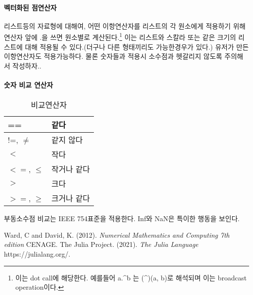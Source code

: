 \documentclass[a4paper, 11pt]{report}
\theoremstyle{definition}
\begin{document}
\paragraph{벡터화된 점연산자} 리스트등의 자료형에 대해여, 어떤 이항연산자를 리스트의 각 원소에게 적용하기 위해 연산자 앞에
.을 쓰면 원소별로 계산된다.\footnote{이는 dot call에 해당한다. 예를들어 a.\^{}b 는 (\^{})(a, b)로 해석되며 이는 broadcast operation이다. } 
이는 리스트와 스칼라 또는 같은 크기의 리스트에 대해 적용될 수 있다.(더구나 다른 형태끼리도 가능한경우가 있다.) 유저가 만든 이항연산자도 적용가능하다.
물론 숫자들과 적용시 소수점과 헷갈리지 않도록 주의해서 작성하자..
\paragraph{숫자 비교 연산자}
\begin{table}[h]
    \begin{tabular}{|l|l|}\hline
        == & 같다 \\ \hline
        !=, $\neq$ & 같지 않다 \\ \hline
        $<$ & 작다 \\ \hline
        $<=$, $\leq$ &  작거나 같다 \\ \hline
        $>$ & 크다 \\ \hline
        $>=$, $\geq $ & 크거나 같다 \\ \hline

    \end{tabular}
    \caption{비교연산자}
\end{table}

부동소수점 비교는 IEEE 754표준을 적용한다. Inf와 NaN은 특이한 행동을 보인다.

\begin{thebibliography}{123456}
     Ward, C and David, K. (2012). \emph{Numerical Mathematics and Computing 7th edition} CENAGE.
     The Julia Project. (2021). \emph{The Julia Language} https://julialang.org/.
\end{thebibliography}
\end{document}

